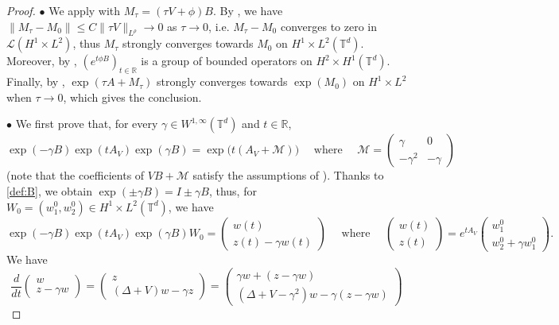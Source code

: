 \documentclass[10pt,a4paper]{amsart}
\newcommand{\R}{\mathbb{R}}
\newcommand{\T}{\mathbb{T}}
\begin{document}
\begin{proof}
\noindent $\bullet$ We apply  with $M_{\tau}=(\tau V+\phi) B$. By , we have $\| M_{\tau}-M_0\| \leq C \|\tau V \|_{L^{\rho}} \to 0$ as $\tau \to 0$, i.e. $M_{\tau}-M_0$ converges to zero in $\mathcal{L}(H^1 \times L^2)$, thus $M_{\tau}$ strongly converges towards $M_0$ on $H^1 \times L^2(\T^d)$.
Moreover, by , $(e^{t\phi B})_{t\in\mathbb{R}}$ is a group of bounded operators on $H^2 \times H^1(\T^d)$. Finally, by , $\exp(\tau A+M_{\tau})$ strongly converges towards $\exp(M_0)$ on $H^1 \times L^2$ when $\tau \to 0$, which gives the conclusion.   

\medskip

\noindent $\bullet$ We first prove that, for every $\gamma \in W^{1,\infty}(\T^d)$ and $t\in\R$,
\begin{equation} \label{formule1}
\exp(-\gamma B) \exp(t A_V) \exp( \gamma B) = \exp\big(t(A_V+\mathcal{M})\big) 
\quad \text{ where } \quad \mathcal{M}=\begin{pmatrix}
\gamma & 0 \\ -\gamma^2 & -\gamma
\end{pmatrix}
\end{equation}
(note that the coefficients of $VB+\mathcal{M}$ satisfy the assumptions of ).
Thanks to \eqref{def:B}, we obtain $\exp(\pm \gamma B)=I\pm\gamma B$, thus,
for $W_0=(w_1^0,w_2^0) \in H^1 \times L^2(\T^d)$, we have
$$\exp(-\gamma B) \exp(t A_V) \exp( \gamma B) W_0 =
\begin{pmatrix}
    w(t) \\ z(t)-\gamma w(t)
\end{pmatrix}
\quad \text{ where } \quad
\begin{pmatrix}
    w(t) \\ z(t)
\end{pmatrix}
= e^{t A_V} \begin{pmatrix}
    w_1^0 \\ w_2^0+\gamma w_1^0
\end{pmatrix}.$$
We have 
$$\frac{d}{dt} 
\begin{pmatrix}
    w \\ z-\gamma w
\end{pmatrix}
=
\begin{pmatrix}
    z \\ (\Delta+V)w-\gamma z
\end{pmatrix}
=\begin{pmatrix}
   \gamma w + (z-\gamma w) \\ (\Delta+V-\gamma^2)w-\gamma (z-\gamma w)

\end{pmatrix}$$
\end{proof}
\end{document}
